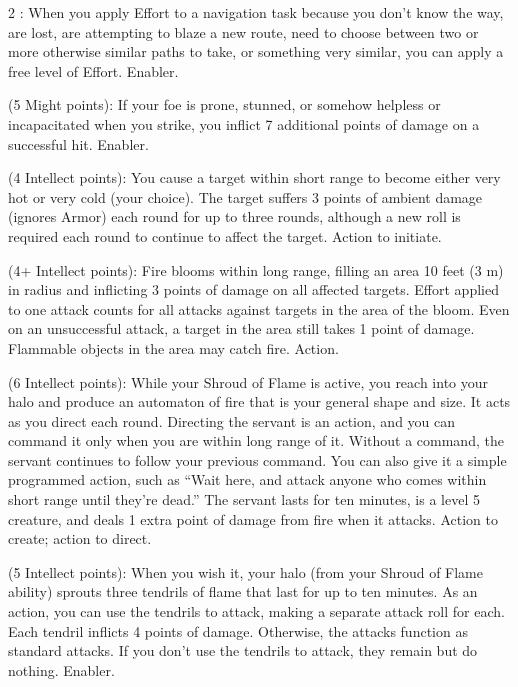 \begin{multicols}{2}
: When you apply Effort to a navigation task because you don’t know the way, are lost, are attempting to blaze a new route, need to choose between two or more otherwise similar paths to take, or something very similar, you can apply a free level of Effort. Enabler.
 
 (5 Might points): If your foe is prone, stunned, or somehow helpless or incapacitated when you strike, you inflict 7 additional points of damage on a successful hit. Enabler. 
 
 (4 Intellect points): You cause a target within short range to become either very hot or very cold (your choice). The target suffers 3 points of ambient damage (ignores Armor) each round for up to three rounds, although a new roll is required each round to continue to affect the target. Action to initiate. 
 
 (4+ Intellect points): Fire blooms within long range, filling an area 10 feet (3 m) in radius and inflicting 3 points of damage on all affected targets. Effort applied to one attack counts for all attacks against targets in the area of the bloom. Even on an unsuccessful attack, a target in the area still takes 1 point of damage. Flammable objects in the area may catch fire. Action.
 
 (6 Intellect points): While your Shroud of Flame is active, you reach into your halo and produce an automaton of fire that is your general shape and size. It acts as you direct each round. Directing the servant is an action, and you can command it only when you are within long range of it. Without a command, the servant continues to follow your previous command. You can also give it a simple programmed action, such as “Wait here, and attack anyone who comes within short range until they’re dead.” The servant lasts for ten minutes, is a level 5 creature, and deals 1 extra point of damage from fire when it attacks. Action to create; action to direct. 
 
 (5 Intellect points): When you wish it, your halo (from your Shroud of Flame ability) sprouts three tendrils of flame that last for up to ten minutes. As an action, you can use the tendrils to attack, making a separate attack roll for each. Each tendril inflicts 4 points of damage. Otherwise, the attacks function as standard attacks. If you don’t use the tendrils to attack, they remain but do nothing. Enabler. 
 

\end{multicols}
